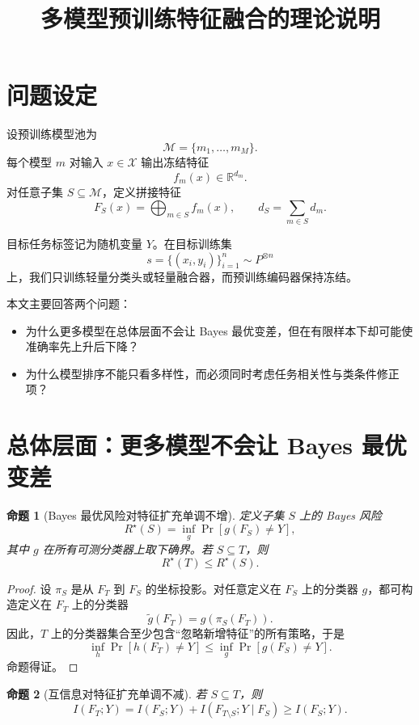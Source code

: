 \documentclass[UTF8,fontset=fandol]{ctexart}
\title{多模型预训练特征融合的理论说明}
\author{}
\date{}
\newtheorem{proposition}{命题}
\theoremstyle{remark}
\begin{document}
\maketitle

\section{问题设定}

设预训练模型池为
\[
\mathcal M = \{m_1, \dots, m_M\}.
\]
每个模型 $m$ 对输入 $x \in \mathcal X$ 输出冻结特征
\[
f_m(x) \in \mathbb R^{d_m}.
\]
对任意子集 $S \subseteq \mathcal M$，定义拼接特征
\[
F_S(x) = \bigoplus_{m \in S} f_m(x), \qquad d_S = \sum_{m \in S} d_m.
\]

目标任务标签记为随机变量 $Y$。在目标训练集
\[
s = \{(x_i, y_i)\}_{i=1}^n \sim P^{\otimes n}
\]
上，我们只训练轻量分类头或轻量融合器，而预训练编码器保持冻结。

本文主要回答两个问题：
\begin{itemize}
    \item 为什么更多模型在总体层面不会让 Bayes 最优变差，但在有限样本下却可能使准确率先上升后下降？
    \item 为什么模型排序不能只看多样性，而必须同时考虑任务相关性与类条件修正项？
\end{itemize}

\section{总体层面：更多模型不会让 Bayes 最优变差}

\begin{proposition}[Bayes 最优风险对特征扩充单调不增]
定义子集 $S$ 上的 Bayes 风险
\[
R^\star(S) = \inf_g \Pr[g(F_S) \neq Y],
\]
其中 $g$ 在所有可测分类器上取下确界。若 $S \subseteq T$，则
\[
R^\star(T) \le R^\star(S).
\]
\end{proposition}

\begin{proof}
设 $\pi_S$ 是从 $F_T$ 到 $F_S$ 的坐标投影。对任意定义在 $F_S$ 上的分类器 $g$，都可构造定义在 $F_T$ 上的分类器
\[
\tilde g(F_T) = g(\pi_S(F_T)).
\]
因此，$T$ 上的分类器集合至少包含“忽略新增特征”的所有策略，于是
\[
\inf_h \Pr[h(F_T) \neq Y] \le \inf_g \Pr[g(F_S) \neq Y].
\]
命题得证。
\end{proof}

\begin{proposition}[互信息对特征扩充单调不减]
若 $S \subseteq T$，则
\[
I(F_T; Y) = I(F_S; Y) + I(F_{T \setminus S}; Y \mid F_S) \ge I(F_S; Y).
\]
\end{proposition}
\end{document}
